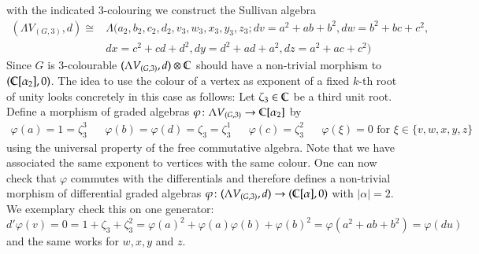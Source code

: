 \begin{Example}
with the indicated $3$-colouring we construct the Sullivan algebra 
\begin{align*} 
(\Lambda V_{(G,3)},d) \cong &\Lambda(a_2,b_2,c_2,d_2,v_3,w_3,x_3,y_3,z_3 ; dv = a^2 + ab + b^2, dw = b^2 + bc + c^2, \\
 &dx = c^2 + cd + d^2, dy = d^2 + ad + a^2 , dz = a^2 + ac + c^2)
\end{align*}
Since $G$ is $3$-colourable $(\Lambda V_{(G,3)},d) \otimes \mathbb{C}$  should have a non-trivial morphism to
$( \mathbb{C}[\alpha_2], 0)$. The idea to use the colour of a vertex as exponent of a fixed $k$-th root of unity looks 
concretely in this case as follows:
Let $\zeta_3 \in \mathbb{C}$ be a third unit root. Define a morphism of graded algebras
$\varphi \colon \Lambda V_{(G,3)} \to \mathbb{C} [ \alpha_2]$ by 
\begin{align*}
\varphi(a) = 1 = \zeta_3^3 & & \varphi(b) = \varphi(d) = \zeta_3 = \zeta_3^1&  & \varphi(c) = \zeta_3^2 & &
\text{$\varphi(\xi) = 0$ for $\xi \in \lbrace v,w,x,y,z \rbrace$} 
\end{align*}
using the universal property of the free commutative algebra. Note that we have associated the same exponent
to vertices with the same colour.
One can now check that $\varphi$ commutes with the differentials and therefore defines a non-trivial morphism of differential graded algebras
$\varphi \colon (\Lambda V_{(G,3)}, d) \to (\mathbb{C} [ \alpha], 0)$ with $|\alpha| = 2$. We exemplary check this on one generator:
$$d'\varphi(v) = 0 = 1 + \zeta_3 + \zeta_3^2 = \varphi( a)^2 + \varphi( a)\varphi(b) + \varphi ( b)^2 = 
\varphi(a^2 + ab + b^2) = \varphi( du)$$
and the same works for $w,x,y$ and $z$. 
  \end{Example}

